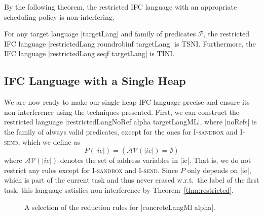 By the following theorem, the restricted IFC language with an
appropriate scheduling policy is non-interfering.

\begin{theorem}
  \label{thm:restricted}
  For any target language |targetLang| and family of predicates
  $\mathcal{P}$, the restricted IFC language |restrictedLang roundrobinf targetLang|
  is TSNI.  Furthermore, the IFC language
  |restrictedLang seqf targetLang| is TINI.
\end{theorem}


\subsection{IFC Language with a Single Heap}

We are now ready to make our single heap IFC language precise and
ensure its non-interference using the techniques presented.
First, we can construct the restricted language
|restrictedLangNoRef alpha targetLangML|, where |noRefs| is
the family of always valid predicates, except for the ones for
\textsc{I-sandbox} and \textsc{I-send}, which we define as
\[ P(|ie|) = (\mathcal{AV}(|ie|) = \emptyset{}) \]
where $\mathcal{AV}(|ie|)$ denotes the set of address variables in |ie|.
That is, we do not restrict any rules except for \textsc{I-sandbox}
and \textsc{I-send}.
Since $P$ only depends on |ie|, which is part of the current
task and thus never erased w.r.t.\ the label of the first task,
this language satisfies non-interference by Theorem~\ref{thm:restricted}.

\begin{figure}
  
  
  \caption{A selection of the reduction rules for |concreteLangMl alpha|.}
  \label{fig:concrete}
\end{figure}

